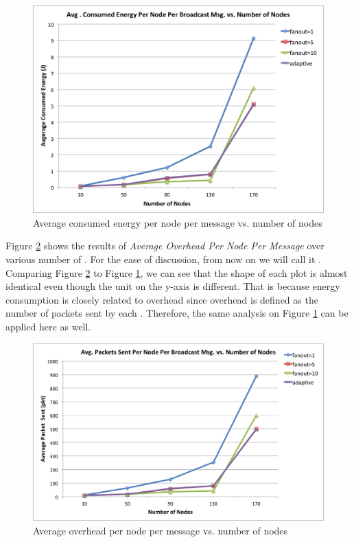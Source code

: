 \begin{figure} 
	\centering
	\includegraphics[width=5.5in]{energy.png}
	\caption{Average consumed energy per node per message vs. number of nodes}
	\label{fig:energy}
\end{figure}

Figure \ref{fig:overhead} shows the results of \emph{Average Overhead Per Node Per Message} over various number of \gns. For the ease of discussion, from now on we will call it \emph{\ao}. Comparing Figure \ref{fig:overhead} to Figure \ref{fig:energy}, we can see that the shape of each plot is almost identical even though the unit on the y-axis is different. That is because energy consumption is closely related to overhead since overhead is defined as the number of packets sent by each \gn. Therefore, the same analysis on Figure \ref{fig:energy} can be applied here as well.

\begin{figure} 
	\centering
	\includegraphics[width=5.5in]{overhead.png}
	\caption{Average overhead per node per message vs. number of nodes}
	\label{fig:overhead}
\end{figure}

